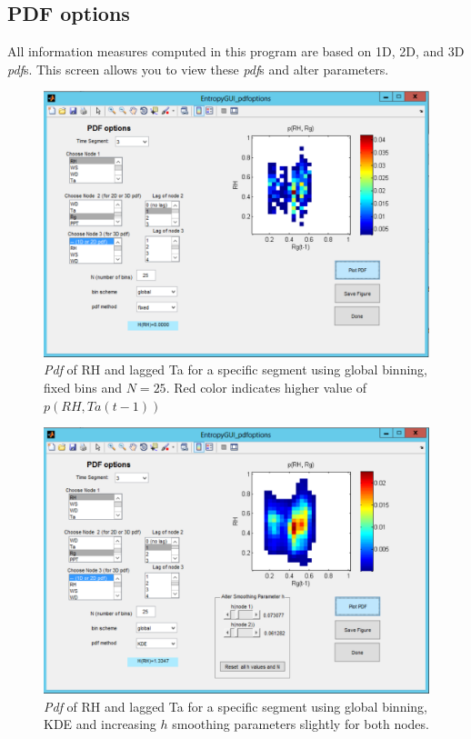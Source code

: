 \documentclass[a4paper]{article}
\begin{document}
\subsection{PDF options}
All information measures computed in this program are based on 1D, 2D, and 3D \textit{pdf}s.  This screen allows you to view these \textit{pdf}s and alter parameters.



\begin{figure}[h!]\label{fig:pdf_fixed}
\begin{center}
\includegraphics[scale=.5]{Image_PDF_RHTA_fixed.pdf}
\caption{\textit{Pdf} of RH and lagged Ta for a specific segment using global binning, fixed bins and $N=25$.  Red color indicates higher value of $p(RH,Ta(t-1))$}
\end{center}
\end{figure}

\begin{figure}[h!]\label{fig:pdf_KDE}
\begin{center}
\includegraphics[scale=.5]{Image_PDF_RHTA_KDE.pdf}
\caption{\textit{Pdf} of RH and lagged Ta for a specific segment using global binning, KDE and increasing $h$ smoothing parameters slightly for both nodes.}
\end{center}
\end{figure}
\end{document}

